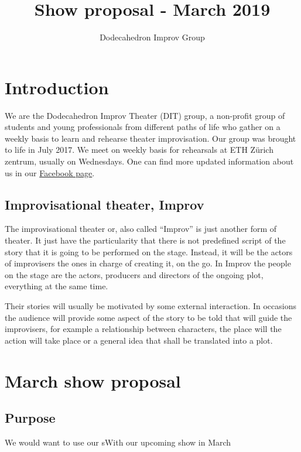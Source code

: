 \documentclass[11pt,a4paper,fleqn,twoside]{article}
\title{Show proposal - March 2019}
\author{Dodecahedron Improv Group}
\begin{document}
\maketitle
\clearpage
\tableofcontents
\clearpage

\section{Introduction}

We are the Dodecahedron Improv Theater (DIT) group, a non-profit group of students and young professionals from different paths of life who gather on a weekly basis to learn and rehearse theater improvisation. Our group was brought to life in July 2017. We meet on weekly basis for rehearsals at ETH Zürich zentrum, usually on Wednesdays. One can find more updated information about us in our \href{https://www.facebook.com/dodecahedronimprovtheater/}{Facebook page}.

\subsection{Improvisational theater, Improv}

The improvisational theater or, also called ``Improv'' is just another form of theater. It just have the particularity that there is not predefined script of the story that it is going to be performed on the stage. Instead, it will be the actors of improvisers the ones in charge of creating it, on the go. In Improv the people on the stage are the actors, producers and directors of the ongoing plot, everything at the same time.

Their stories will usually be motivated by some external interaction. In occasions the audience will provide some aspect of the story to be told that will guide the improvisers, for example a relationship between characters, the place will the action will take place or a general idea that shall be translated into a plot. 

\section{March show proposal}

\subsection{Purpose}

We would want to use our sWith our upcoming show in March 
\end{document}

